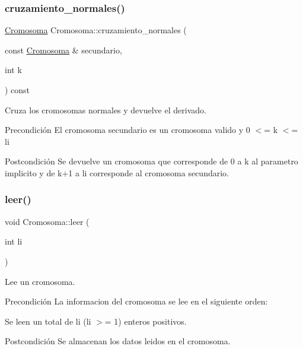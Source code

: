 \subsubsection{\texorpdfstring{cruzamiento\+\_\+normales()}{cruzamiento\_normales()}}
{\footnotesize\ttfamily \hyperlink{class_cromosoma}{Cromosoma} Cromosoma\+::cruzamiento\+\_\+normales (\begin{DoxyParamCaption}\item[{const \hyperlink{class_cromosoma}{Cromosoma} \&}]{secundario,  }\item[{int}]{k }\end{DoxyParamCaption}) const}



Cruza los cromosomas normales y devuelve el derivado. 

\begin{DoxyPrecond}{Precondición}
El cromosoma secundario es un cromosoma valido y 0 $<$= k $<$= li 
\end{DoxyPrecond}
\begin{DoxyPostcond}{Postcondición}
Se devuelve un cromosoma que corresponde de 0 a k al parametro implicito y de k+1 a li corresponde al cromosoma secundario. 
\end{DoxyPostcond}
\mbox{\label{class_cromosoma_abf3ef15e3f9af661572a768029e9c959}} 
\subsubsection{\texorpdfstring{leer()}{leer()}}
{\footnotesize\ttfamily void Cromosoma\+::leer (\begin{DoxyParamCaption}\item[{int}]{li }\end{DoxyParamCaption})}



Lee un cromosoma. 

\begin{DoxyPrecond}{Precondición}
La informacion del cromosoma se lee en el siguiente orden\+:
\begin{DoxyEnumerate}
\item Se leen un total de li (li $>$= 1) enteros positivos. 
\end{DoxyEnumerate}
\end{DoxyPrecond}
\begin{DoxyPostcond}{Postcondición}
Se almacenan los datos leidos en el cromosoma. 
\end{DoxyPostcond}
\mbox{\label{class_cromosoma_abc5487f92ef3cb6f982ddcfc63d77b47}} 
